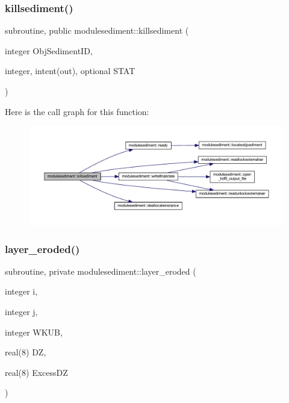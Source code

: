 \subsubsection{\texorpdfstring{killsediment()}{killsediment()}}
{\footnotesize\ttfamily subroutine, public modulesediment\+::killsediment (\begin{DoxyParamCaption}\item[{integer}]{Obj\+Sediment\+ID,  }\item[{integer, intent(out), optional}]{S\+T\+AT }\end{DoxyParamCaption})}

Here is the call graph for this function\+:\nopagebreak
\begin{figure}[H]
\begin{center}
\leavevmode
\includegraphics[width=350pt]{namespacemodulesediment_a3799836daf0cb05055644810de5e7fd0_cgraph}
\end{center}
\end{figure}
\mbox{\label{namespacemodulesediment_aba4245ac07452ebcf189f0cf9617d234}} 
\subsubsection{\texorpdfstring{layer\+\_\+eroded()}{layer\_eroded()}}
{\footnotesize\ttfamily subroutine, private modulesediment\+::layer\+\_\+eroded (\begin{DoxyParamCaption}\item[{integer}]{i,  }\item[{integer}]{j,  }\item[{integer}]{W\+K\+UB,  }\item[{real(8)}]{DZ,  }\item[{real(8)}]{Excess\+DZ }\end{DoxyParamCaption})\hspace{0.3cm}{\ttfamily [private]}}

